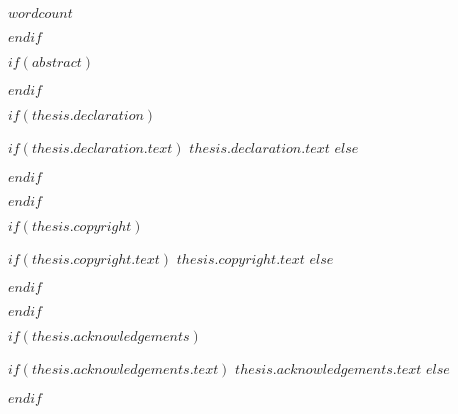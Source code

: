 \begin{wordcount}
$wordcount$
\end{wordcount}

$endif$

$if(abstract)$

\begin{abstract}[]
\addchaptertocentry{\abstractname} %
$abstract$
\end{abstract}

$endif$

$if(thesis.declaration)$
\begin{declaration}
\addchaptertocentry{\authorshipname} %
$if(thesis.declaration.text)$
$thesis.declaration.text$
$else$

$endif$

\end{declaration}

$endif$


$if(thesis.copyright)$
\begin{copyright}
\addchaptertocentry{\copyrightname} %
$if(thesis.copyright.text)$
$thesis.copyright.text$
$else$

$endif$

\end{copyright}

$endif$

$if(thesis.acknowledgements)$

\begin{acknowledgements}
\addchaptertocentry{\acknowledgementname} %
$if(thesis.acknowledgements.text)$
$thesis.acknowledgements.text$
$else$

$endif$
\end{acknowledgements}

